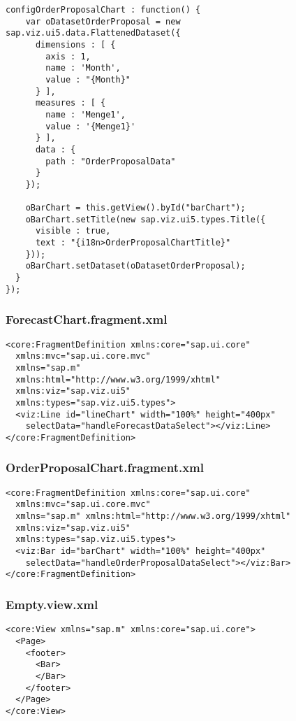 \begin{lstlisting}[frame=htrbl, label=lst:Detail.controller.js]
  configOrderProposalChart : function() {
    var oDatasetOrderProposal = new sap.viz.ui5.data.FlattenedDataset({
      dimensions : [ {
        axis : 1,
        name : 'Month',
        value : "{Month}"
      } ],
      measures : [ {
        name : 'Menge1',
        value : '{Menge1}'
      } ],
      data : {
        path : "OrderProposalData"
      }
    });

    oBarChart = this.getView().byId("barChart");
    oBarChart.setTitle(new sap.viz.ui5.types.Title({
      visible : true,
      text : "{i18n>OrderProposalChartTitle}"
    }));
    oBarChart.setDataset(oDatasetOrderProposal);
  }
});
\end{lstlisting}

\newpage
\subsubsection*{ForecastChart.fragment.xml}
\begin{lstlisting}[frame=htrbl, label=lst:ForecastChart.fragment.xml]
<core:FragmentDefinition xmlns:core="sap.ui.core"
  xmlns:mvc="sap.ui.core.mvc" 
  xmlns="sap.m" 
  xmlns:html="http://www.w3.org/1999/xhtml"
  xmlns:viz="sap.viz.ui5" 
  xmlns:types="sap.viz.ui5.types">
  <viz:Line id="lineChart" width="100%" height="400px"
    selectData="handleForecastDataSelect"></viz:Line>
</core:FragmentDefinition>
\end{lstlisting}

\subsubsection*{OrderProposalChart.fragment.xml}
\begin{lstlisting}[frame=htrbl, label=OrderProposalChart.fragment.xml]
<core:FragmentDefinition xmlns:core="sap.ui.core"
  xmlns:mvc="sap.ui.core.mvc" 
  xmlns="sap.m" xmlns:html="http://www.w3.org/1999/xhtml"
  xmlns:viz="sap.viz.ui5" 
  xmlns:types="sap.viz.ui5.types">
  <viz:Bar id="barChart" width="100%" height="400px"
    selectData="handleOrderProposalDataSelect"></viz:Bar>
</core:FragmentDefinition>
\end{lstlisting}

\subsubsection*{Empty.view.xml}
\begin{lstlisting}[frame=htrbl, label=lst:Empty.view.xml]
<core:View xmlns="sap.m" xmlns:core="sap.ui.core">
  <Page>
    <footer>
      <Bar>
      </Bar>
    </footer>
  </Page>
</core:View>
\end{lstlisting}

